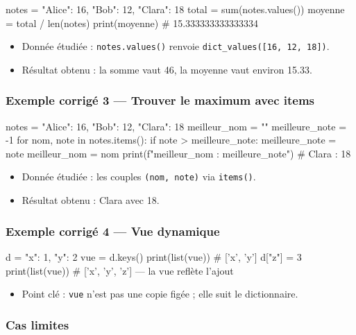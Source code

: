 \begin{python}
notes = {"Alice": 16, "Bob": 12, "Clara": 18}
total = sum(notes.values())
moyenne = total / len(notes)
print(moyenne)  # 15.333333333333334
\end{python}

\begin{itemize}
\tightlist
\item
  Donnée étudiée : \texttt{notes.values()} renvoie
  \texttt{dict\_values({[}16,\ 12,\ 18{]})}.
\item
  Résultat obtenu : la somme vaut 46, la moyenne vaut environ 15.33.
\end{itemize}

\subsubsection{Exemple corrigé 3 — Trouver le maximum avec items}

\begin{python}
notes = {"Alice": 16, "Bob": 12, "Clara": 18}
meilleur_nom = ""
meilleure_note = -1
for nom, note in notes.items():
    if note > meilleure_note:
        meilleure_note = note
        meilleur_nom = nom
print(f"{meilleur_nom} : {meilleure_note}")  # Clara : 18
\end{python}

\begin{itemize}
\tightlist
\item
  Donnée étudiée : les couples \texttt{(nom,\ note)} via
  \texttt{items()}.
\item
  Résultat obtenu : Clara avec 18.
\end{itemize}

\subsubsection{Exemple corrigé 4 — Vue dynamique}

\begin{python}
d = {"x": 1, "y": 2}
vue = d.keys()
print(list(vue))  # ['x', 'y']
d["z"] = 3
print(list(vue))  # ['x', 'y', 'z']  — la vue reflète l'ajout
\end{python}

\begin{itemize}
\tightlist
\item
  Point clé : \texttt{vue} n'est pas une copie figée ; elle suit le
  dictionnaire.
\end{itemize}

\subsubsection{Cas limites}

